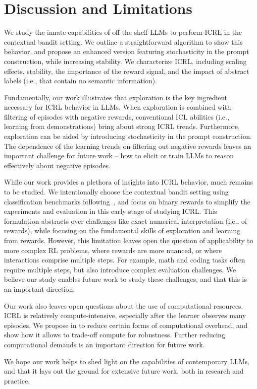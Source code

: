 \section{Discussion and Limitations}\label{sec:disc}

We study the innate capabilities of off-the-shelf LLMs to perform ICRL in the contextual bandit setting. We outline a straightforward algorithm to show this behavior, and propose an enhanced version featuring stochasticity in the prompt construction, while increasing stability. 
We characterize ICRL, including scaling effects, stability, the importance of the reward signal, and the impact of abstract labels (i.e., that contain no semantic information). 

Fundamentally, our work illustrates that exploration is the key ingredient necessary for ICRL behavior in LLMs. When exploration is combined with filtering of episodes with negative rewards, conventional ICL abilities (i.e., learning from demonstrations) bring about strong ICRL trends. 
Furthermore, exploration can be aided by introducing stochasticity in the prompt construction. 
The dependence of the learning trends on filtering out negative rewards leaves an important challenge for future work -- how to elicit or train LLMs to reason effectively about negative episodes. 



While our work provides a plethora of insights into ICRL behavior, much remains to be studied. 
We intentionally choose the contextual bandit setting using classification benchmarks following~\citep{pmlr-v97-zhang19b, bietti2021contextual}, and focus on binary rewards to simplify the experiments and evaluation in this early stage of studying ICRL. This formulation abstracts over challenges like exact numerical interpretation (i.e., of rewards), while focusing on the fundamental skills of exploration and learning from rewards. 
However, this limitation leaves open the question of applicability to more complex RL problems, where rewards are more nuanced, or where interactions comprise multiple steps. 
For example, math and coding tasks often require multiple steps, but also introduce complex evaluation challenges. 
We believe our study enables future work to study these challenges, and that this is an important direction. 


Our work also leaves open questions about the use of computational resources. ICRL is relatively compute-intensive, especially after the learner observes many episodes. 
We propose \approximate in  to reduce certain forms of computational overhead, and show how it allows to trade-off compute for robustness. 
Further reducing computational demands is an important direction for future work. 


We hope our work helps to shed light on the capabilities of contemporary LLMs, and that it lays out the ground for extensive future work, both in research and practice. 


